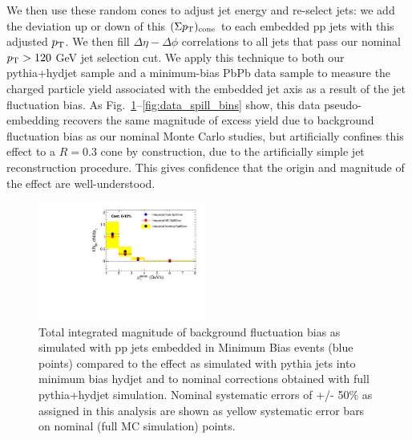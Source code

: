 We then use these random cones to adjust jet energy and re-select jets:  we add the deviation up or down of this $(\Sigma p_{\rm T})_{\rm cone}$ to each embedded pp jets with this adjusted $p_{\rm T}$.  We then fill $\Delta\eta - \Delta\phi$ correlations to all jets that pass our nominal $p_{\rm T} > 120$ GeV jet selection cut.  We apply this technique to both our {\sc pythia+hydjet} sample and a minimum-bias PbPb data sample to measure the charged particle yield associated with the embedded jet axis as a result of the jet fluctuation bias.  As Fig.~\ref{fig:data_spill_int}--\ref{fig:data_spill_bins} show, this data pseudo-embedding recovers the same magnitude of excess yield due to background fluctuation bias as our nominal Monte Carlo studies, but artificially confines this effect to a $R = 0.3$ cone by construction, due to the artificially simple jet reconstruction procedure.  This gives confidence that the origin and magnitude of the effect are well-understood.

\begin{figure}[h!]
\begin{center}
\includegraphics[width=0.49\textwidth]{figures/JFF_SpillOver/Data_Closure_Integrals.pdf}

\caption[Data-driven check of integrated yields attributed to background fluctuation bias]{Total integrated magnitude of background fluctuation bias as simulated with pp jets embedded in Minimum Bias events (blue points) compared to the effect as simulated with {\sc pythia}  jets into minimum bias {\sc hydjet} and to nominal corrections obtained with full {\sc pythia+hydjet} simulation. Nominal systematic errors of +/- 50\% as assigned in this analysis are shown as yellow systematic error bars on nominal (full MC simulation) points.}
\label{fig:data_spill_int}
\end{center}
\end{figure}


